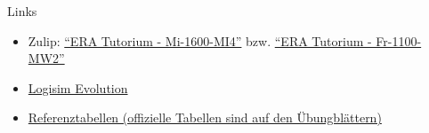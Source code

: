 \begin{frame}[fragile, c]{Links}{}
	\begin{itemize}
		\item Zulip: \href{https://zulip.in.tum.de/#narrow/stream/1917-ERA-Tutorium---Mi-1600-MI4}{\enquote{ERA Tutorium - Mi-1600-MI4}}
		      bzw. \href{https://zulip.in.tum.de/#narrow/stream/1940-ERA-Tutorium---Fr-1100-MW2}{\enquote{ERA Tutorium - Fr-1100-MW2}}
		\item \href{https://github.com/logisim-evolution/logisim-evolution/releases}{Logisim Evolution}
		\item \href{https://courses.edx.org/assets/courseware/v1/f06a2dc0c856f60ec0711e9f5e1c98cf/asset-v1:HarveyMuddX+ENGR85B+1T2023+type@asset+block/FinalReferences.pdf}{Referenztabellen (offizielle Tabellen sind auf den Übungblättern)}
	\end{itemize}
\end{frame}

\maketitle


